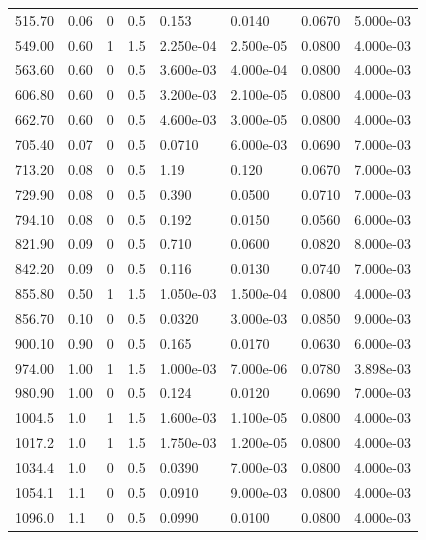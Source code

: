 \documentclass[preview]{standalone}
\begin{document}
{{\begin{tabular}{L{1.2cm}C{1.2cm} C{0.3cm}C{0.5cm} C{1.4cm}C{1.4cm} C{1.4cm}C{1.4cm}}
  515.70  &  0.06  & 0     & 0.5 &  0.153  & 0.0140  & 0.0670 &  5.000e-03   \\ 
  549.00  &  0.60  & 1     & 1.5 &  2.250e-04  & 2.500e-05  & 0.0800 &  4.000e-03   \\ 
  563.60  &  0.60  & 0     & 0.5 &  3.600e-03  & 4.000e-04  & 0.0800 &  4.000e-03   \\ 
  606.80  &  0.60  & 0     & 0.5 &  3.200e-03  & 2.100e-05  & 0.0800 &  4.000e-03   \\ 
  662.70  &  0.60  & 0     & 0.5 &  4.600e-03  & 3.000e-05  & 0.0800 &  4.000e-03   \\ 
  705.40  &  0.07  & 0     & 0.5 &  0.0710  & 6.000e-03  & 0.0690 &  7.000e-03   \\ 
  713.20  &  0.08  & 0     & 0.5 &  1.19  & 0.120  & 0.0670 &  7.000e-03   \\ 
  729.90  &  0.08  & 0     & 0.5 &  0.390  & 0.0500  & 0.0710 &  7.000e-03   \\ 
  794.10  &  0.08  & 0     & 0.5 &  0.192  & 0.0150  & 0.0560 &  6.000e-03   \\ 
  821.90  &  0.09  & 0     & 0.5 &  0.710  & 0.0600  & 0.0820 &  8.000e-03   \\ 
  842.20  &  0.09  & 0     & 0.5 &  0.116  & 0.0130  & 0.0740 &  7.000e-03   \\ 
  855.80  &  0.50  & 1     & 1.5 &  1.050e-03  & 1.500e-04  & 0.0800 &  4.000e-03   \\ 
  856.70  &  0.10  & 0     & 0.5 &  0.0320  & 3.000e-03  & 0.0850 &  9.000e-03   \\ 
  900.10  &  0.90  & 0     & 0.5 &  0.165  & 0.0170  & 0.0630 &  6.000e-03   \\ 
  974.00  &  1.00  & 1     & 1.5 &  1.000e-03  & 7.000e-06  & 0.0780 &  3.898e-03   \\ 
  980.90  &  1.00  & 0     & 0.5 &  0.124  & 0.0120  & 0.0690 &  7.000e-03   \\ 
  1004.5  &   1.0  & 1     & 1.5 &  1.600e-03  & 1.100e-05  & 0.0800 &  4.000e-03   \\ 
  1017.2  &   1.0  & 1     & 1.5 &  1.750e-03  & 1.200e-05  & 0.0800 &  4.000e-03   \\ 
  1034.4  &   1.0  & 0     & 0.5 &  0.0390  & 7.000e-03  & 0.0800 &  4.000e-03   \\ 
  1054.1  &   1.1  & 0     & 0.5 &  0.0910  & 9.000e-03  & 0.0800 &  4.000e-03   \\ 
  1096.0  &   1.1  & 0     & 0.5 &  0.0990  & 0.0100  & 0.0800 &  4.000e-03   \\ 

\end{tabular}}}
\end{document}
